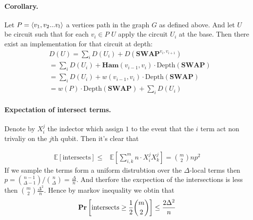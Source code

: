 \documentclass{article}
\begin{document}
      \paragraph{Corollary.} Let \(P = \braket{v_{1}, v_{2} ... v_{l}}\) a vertices path in the graph \(G\) as defined above. And let \(U\) be circuit such that for each \(v_{i} \in P \) \(U\) apply the circuit \(U_{i}\) at the  base. Then there exist an implementation for that circuit at depth:
      \begin{equation*}
	\begin{split}
	  & D(U) = \sum_{i}{D\left(U_{i}\right)+D\left(\textbf{SWAP}^{v_{i},v_{i+1}}\right)}\\
	  & = \sum_{i}{D\left(U_{i}\right) + \textbf{Ham}(v_{i-1},v_{i}) \cdot\text{Depth}\left(\textbf{SWAP}\right)} \\ 
	  & = \sum_{i}{D\left(U_{i}\right) + w(v_{i-1},v_{i}) \cdot\text{Depth}\left(\textbf{SWAP}\right)} \\
	  & = w\left(P\right)\cdot\text{Depth}\left(\textbf{SWAP}\right) +   \sum_{i}{D\left(U_{i}\right) }  
	\end{split}
      \end{equation*}



      \paragraph{Expectation of intersect terms.} Denote by $X_{i}^{j}$ the indector which assign $1$ to the event that the $i$ term act non trivaliy on the $j$th qubit. Then it's clear that

      \begin{equation*}
	\begin{split}
	  \mathbb{E}\left[ \text{intersects} \right] \le & \mathbb{E}\left[ \sum_{i,k}^{m}{n\cdot X_{i}^{j}X_{k}^{j}} \right]  = {m \choose 2}np^2 
	\end{split}
      \end{equation*}
      If we sample the terms form a uniform distrubtion over the $\Delta$-local terms then $p =  { n -1 \choose \Delta -1 }/ {n \choose \Delta}  = \frac{\Delta}{n}$. And therfore the excpection of the intersections is less then ${ m \choose 2}\frac{\Delta^2}{n}$. Hence by markov inequality we obtin that 
      \begin{equation*}
	\mathbf{Pr} \left[ { \text{intersects} \ge \frac{1}{2} { m \choose 2}  } \right] \le \frac{2\Delta^2}{n} 
      \end{equation*}
\end{document}
